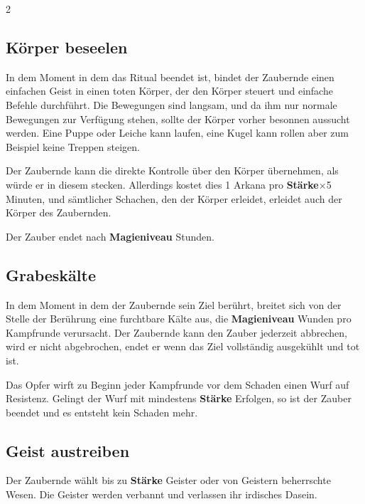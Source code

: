\begin{multicols*}{2}


\subsection{Körper beseelen}

In dem Moment in dem das Ritual beendet ist, bindet der Zaubernde einen einfachen Geist in einen toten Körper, der den Körper steuert und einfache Befehle durchführt. Die Bewegungen sind langsam, und da ihm nur normale Bewegungen zur Verfügung stehen, sollte der Körper vorher besonnen aussucht werden. Eine Puppe oder Leiche kann laufen, eine Kugel kann rollen aber zum Beispiel keine Treppen steigen.

Der Zaubernde kann die direkte Kontrolle über den Körper übernehmen, als würde er in diesem stecken. Allerdings kostet dies 1 Arkana pro \textbf{Stärke}×5 Minuten, und sämtlicher Schachen, den der Körper erleidet, erleidet auch der Körper des Zaubernden.

Der Zauber endet nach \textbf{Magieniveau} Stunden.



\subsection{Grabeskälte}

In dem Moment in dem der Zaubernde sein Ziel berührt, breitet sich von der Stelle der Berührung eine furchtbare Kälte aus, die \textbf{Magieniveau} Wunden pro Kampfrunde verursacht. Der Zaubernde kann den Zauber jederzeit abbrechen, wird er nicht abgebrochen, endet er wenn das Ziel vollständig ausgekühlt und tot ist.

Das Opfer wirft zu Beginn jeder Kampfrunde vor dem Schaden einen Wurf auf Resistenz. Gelingt der Wurf mit mindestens \textbf{Stärke} Erfolgen, so ist der Zauber beendet und es entsteht kein Schaden mehr.



\subsection{Geist austreiben}

Der Zaubernde wählt bis zu \textbf{Stärke} Geister oder von Geistern beherrschte Wesen. Die Geister werden verbannt und verlassen ihr irdisches Dasein.


\end{multicols*}
